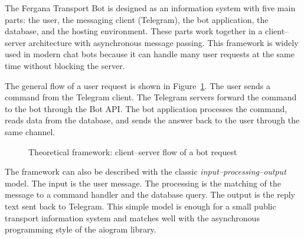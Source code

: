 The Fergana Transport Bot is designed as an information system with five
main parts: the user, the messaging client (Telegram), the bot
application, the database, and the hosting environment. These parts work
together in a client--server architecture with asynchronous message
passing. This framework is widely used in modern chat bots because it can
handle many user requests at the same time without blocking the server.

The general flow of a user request is shown in
Figure~\ref{fig:framework}. The user sends a command from the Telegram
client. The Telegram servers forward the command to the bot through the
Bot API. The bot application processes the command, reads data from the
database, and sends the answer back to the user through the same
channel.

\begin{figure}[h]
\centering
{}
\caption{Theoretical framework: client--server flow of a bot request}
\label{fig:framework}
\end{figure}

The framework can also be described with the classic
\textit{input--processing--output} model. The input is the user message.
The processing is the matching of the message to a command handler and
the database query. The output is the reply text sent back to Telegram.
This simple model is enough for a small public transport information
system and matches well with the asynchronous programming style of the
aiogram library. \cite{aiogram_docs}

